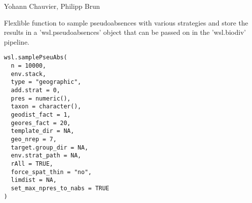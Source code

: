 \documentclass[a4paper]{book}
\begin{document}
%
\begin{Author}\relax
Yohann Chauvier, Philipp Brun
\end{Author}
%
\begin{Description}\relax
Flexlible function to sample pseudoabsences with various strategies and
store the results in a 'wsl.pseudoabsences' object  that can be
passed on in the 'wsl.biodiv' pipeline.
\end{Description}
%
\begin{Usage}
\begin{verbatim}
wsl.samplePseuAbs(
  n = 10000,
  env.stack,
  type = "geographic",
  add.strat = 0,
  pres = numeric(),
  taxon = character(),
  geodist_fact = 1,
  geores_fact = 20,
  template_dir = NA,
  geo_nrep = 7,
  target.group_dir = NA,
  env.strat_path = NA,
  rAll = TRUE,
  force_spat_thin = "no",
  limdist = NA,
  set_max_npres_to_nabs = TRUE
)
\end{verbatim}
\end{Usage}
%
\end{document}
